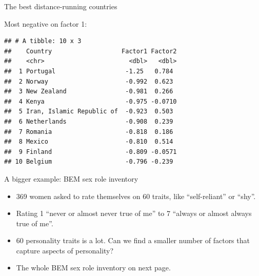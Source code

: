 \documentclass[
  ignorenonframetext,
]{beamer}
\newenvironment{Shaded}{\begin{snugshade}}{\end{snugshade}}
\newcommand{\DataTypeTok}[1]{\textcolor[rgb]{0.13,0.29,0.53}{#1}}
\newcommand{\DecValTok}[1]{\textcolor[rgb]{0.00,0.00,0.81}{#1}}
\newcommand{\KeywordTok}[1]{\textcolor[rgb]{0.13,0.29,0.53}{\textbf{#1}}}
\newcommand{\NormalTok}[1]{#1}
\newcommand{\OperatorTok}[1]{\textcolor[rgb]{0.81,0.36,0.00}{\textbf{#1}}}
\newcommand{\StringTok}[1]{\textcolor[rgb]{0.31,0.60,0.02}{#1}}
\begin{document}
\begin{frame}[fragile]{The best distance-running countries}
\protect\hypertarget{the-best-distance-running-countries}{}

Most negative on factor 1:

\footnotesize

\begin{Shaded}
\end{Shaded}

\begin{verbatim}
## # A tibble: 10 x 3
##    Country                   Factor1 Factor2
##    <chr>                       <dbl>   <dbl>
##  1 Portugal                   -1.25   0.784 
##  2 Norway                     -0.992  0.623 
##  3 New Zealand                -0.981  0.266 
##  4 Kenya                      -0.975 -0.0710
##  5 Iran, Islamic Republic of  -0.923  0.503 
##  6 Netherlands                -0.908  0.239 
##  7 Romania                    -0.818  0.186 
##  8 Mexico                     -0.810  0.514 
##  9 Finland                    -0.809 -0.0571
## 10 Belgium                    -0.796 -0.239
\end{verbatim}

\normalsize

\end{frame}

\begin{frame}{A bigger example: BEM sex role inventory}
\protect\hypertarget{a-bigger-example-bem-sex-role-inventory}{}

\begin{itemize}
\item
  369 women asked to rate themselves on 60 traits, like ``self-reliant''
  or ``shy''.
\item
  Rating 1 ``never or almost never true of me'' to 7 ``always or almost
  always true of me''.
\item
  60 personality traits is a lot. Can we find a smaller number of
  factors that capture aspects of personality?
\item
  The whole BEM sex role inventory on next page.
\end{itemize}

\end{frame}
\end{document}
